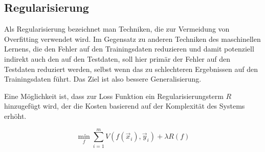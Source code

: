 
\subsection{Regularisierung} \label{ssec:Regul}


Als Regularisierung bezeichnet man Techniken, die zur Vermeidung von Overfitting verwendet wird.
Im Gegensatz zu anderen Techniken des maschinellen Lernens, die den Fehler auf den Trainingsdaten reduzieren und damit potenziell indirekt auch den auf den Testdaten,
soll hier primär der Fehler auf den Testdaten reduziert werden, selbst wenn das zu schlechteren Ergebnissen auf den Trainingsdaten führt.
Das Ziel ist also bessere Generalisierung.

Eine Möglichkeit ist, dass zur Loss Funktion ein Regularisierungsterm \(R\) hinzugefügt wird, 
der die Kosten basierend auf der Komplexität des Systems erhöht.

\begin{equation}
	\min_f \sum\limits_{i=1}^{m} V(f(\vec{x}_i), \vec{y}_i) + \lambda R(f)
\end{equation} 

